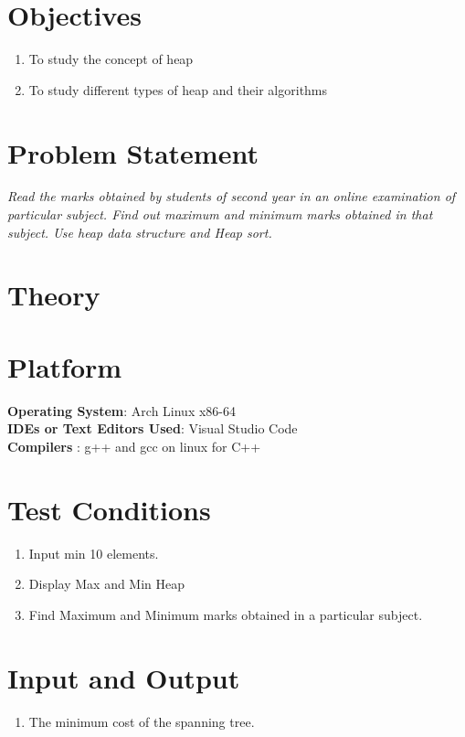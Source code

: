 \documentclass[11pt]{article}
\begin{document}
\tableofcontents
\thispagestyle{empty}
\clearpage

\setcounter{page}{1}

\section{Objectives}
\begin{enumerate}
    \item To study the concept of heap
    \item To study different types of heap and their algorithms
\end{enumerate}

\section{Problem Statement}
\textit{Read the marks obtained by students of second year in an online examination of
    particular subject. Find out maximum and minimum marks obtained in that subject. Use
    heap data structure and Heap sort.}
\section{Theory}


\section{Platform}
\textbf{\textbf{Operating System}}: Arch Linux x86-64 \\
\textbf{\textbf{IDEs or Text Editors Used}}: Visual Studio Code\\
\textbf{\textbf{Compilers} }: g++ and gcc on linux for C++\\

\section{Test Conditions}
\begin{enumerate}
    \item Input min 10 elements.
    \item Display Max and Min Heap
    \item Find Maximum and Minimum marks obtained in a particular subject.
\end{enumerate}

\section{Input and Output}
\begin{enumerate}
    \item The minimum cost of the spanning tree.
\end{enumerate}
\end{document}
